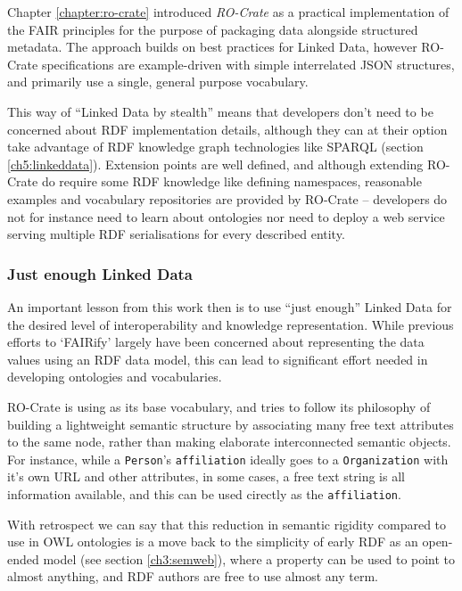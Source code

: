 Chapter \vref{chapter:ro-crate} introduced \emph{RO-Crate} as a practical implementation of the FAIR principles for the purpose of packaging data alongside structured metadata.
The approach builds on best practices for Linked Data, however RO-Crate specifications are example-driven with simple interrelated JSON structures, and primarily use a single, general purpose vocabulary. 

This way of ``Linked Data by stealth'' means that developers don't need to be concerned about RDF implementation details, although they can at their option take advantage of RDF knowledge graph technologies like SPARQL (section \vref{ch5:linkeddata}).
Extension points are well defined, and although extending RO-Crate do require some RDF knowledge like defining namespaces, reasonable examples and vocabulary repositories are provided by RO-Crate --  developers do not for instance need to learn about ontologies nor need to deploy a web service serving multiple RDF serialisations for every described entity.



\subsubsection{Just enough Linked Data}
\label{ch61:justenough}

An important lesson from this work then is to use ``just enough'' Linked Data for the desired level of interoperability and knowledge representation.
While previous efforts to `FAIRify' largely have been concerned about representing the data values using an RDF data model, this can lead to significant effort needed in developing ontologies and vocabularies. 

RO-Crate is using \cite{schema.org} as its base vocabulary, and tries to follow its philosophy of building a lightweight semantic structure by associating many free text attributes to the same node, rather than making elaborate interconnected semantic objects.
For instance, while a \texttt{Person}'s \texttt{affiliation} ideally goes to a \texttt{Organization} with it's own URL and other attributes, in some cases, a free text string is all information available, and this can be used cirectly as the \texttt{affiliation}. 

With retrospect we can say that this reduction in semantic rigidity compared to use in OWL ontologies is a move back to the simplicity of early RDF as an open-ended model (see section \vref{ch3:semweb}), where a property can be used to point to almost anything, and RDF authors are free to use almost any term.

